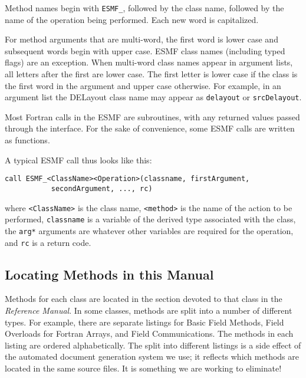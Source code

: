 Method names begin with {\tt ESMF\_}, followed by the class name, 
followed by the name of the operation being performed.  Each new 
word is capitalized. 

For method arguments that are multi-word, the first word is lower
case and subsequent words begin with upper case.  ESMF class 
names (including typed flags) are an exception.  When multi-word 
class names appear in argument lists, all letters after the first 
are lower case.  The first letter is lower case if the class is the
first word in the argument and upper case otherwise.  For 
example, in an argument list the DELayout class name may appear 
as {\tt delayout} or {\tt srcDelayout}.

Most Fortran calls in the ESMF are subroutines, with 
any returned values passed through the interface.  For the sake of 
convenience, some ESMF calls are written as functions.

A typical ESMF call thus looks like this:

\begin{verbatim}
call ESMF_<ClassName><Operation>(classname, firstArgument, 
           secondArgument, ..., rc)
\end{verbatim}

where \newline
{\tt <ClassName>} is the class name, \newline
{\tt <method>} is the name of the action to be performed, \newline 
{\tt classname} is a variable of the derived type associated 
with the class, \newline
the {\tt arg*} arguments are whatever other variables are required 
for the operation, \newline
and {\tt rc} is a return code. \newline

\subsection{Locating Methods in this Manual}

Methods for each class are located in the section devoted to 
that class in the {\it Reference Manual}.  In some classes, methods
are split into a number of different types.  For example, there are 
separate listings for Basic Field Methods, Field Overloads for Fortran Arrays,
and Field Communications.  The methods in each listing are ordered 
alphabetically.  The split into different listings is a side effect
of the automated document generation system we use; it reflects 
which methods are located in the same source files.  It is something 
we are working to eliminate!   


